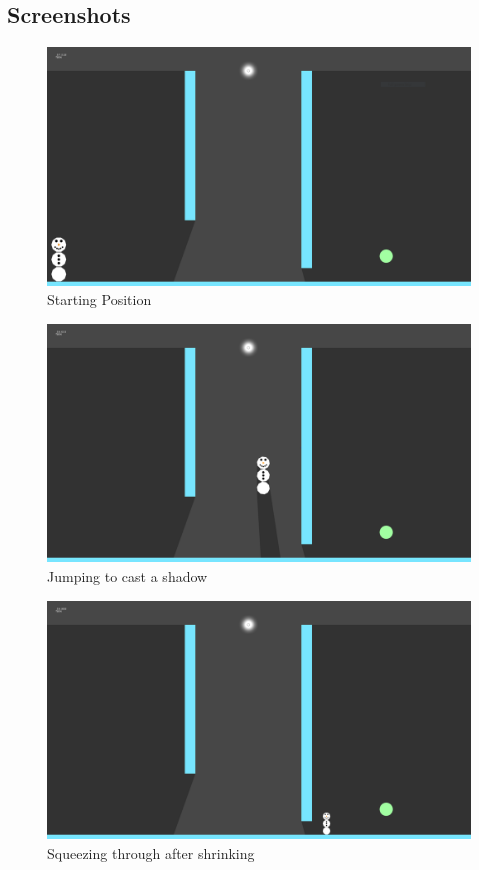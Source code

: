 \documentclass[11pt]{article} %
\begin{document}
\subsection{Screenshots}
\begin{figure}
\centering
\includegraphics[width=5in]{Frosty.png}
\caption{Starting Position}
\end{figure}

\begin{figure}
\centering
\includegraphics[width=5in]{Shadow.png}
\caption{Jumping to cast a shadow}
\end{figure}

\begin{figure}
\centering
\includegraphics[width=5in]{Shrunk.png}
\caption{Squeezing through after shrinking}
\end{figure}
\end{document}
